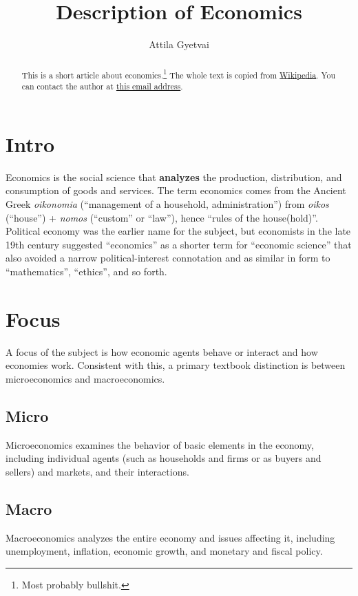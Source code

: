 \documentclass[11pt,a4paper]{article}	%
\title{Description of Economics}
\author{Attila Gyetvai}
\date{}									%
\begin{document}
\maketitle

\begin{abstract}
This is a short article about economics.\footnote{Most probably bullshit.}
The whole text is copied from \href{http://en.wikipedia.org/wiki/Economics}{Wikipedia}.
You can contact the author at \href{mailto:Gyetvai_Attila@student.ceu.hu}{this email address}.
\end{abstract}

\tableofcontents

\section{Intro}\label{sec:intro}

Economics is the social science that \textbf{analyzes} the production, distribution, and consumption of goods and services. \cite{wikiecon}
The term economics comes from the Ancient Greek \emph{oikonomia} (``management of a household, administration'') from \emph{oikos} (``house'') + \emph{nomos} (``custom'' or ``law''), hence ``rules of the house(hold)''.
Political economy was the earlier name for the subject, but economists in the late 19th century suggested ``economics'' as a shorter term for ``economic science'' that also avoided a narrow political-interest connotation and as similar in form to ``mathematics'', ``ethics'', and so forth.

\section{Focus}\label{sec:focus}

A focus of the subject is how economic agents behave or interact and how economies work.
Consistent with this, a primary textbook distinction is between microeconomics and macroeconomics.
\subsection*{Micro}
Microeconomics examines the behavior of basic elements in the economy, including individual agents (such as households and firms or as buyers and sellers) and markets, and their interactions.
\subsection*{Macro}
Macroeconomics analyzes the entire economy and issues affecting it, including unemployment, inflation, economic growth, and monetary and fiscal policy.
\end{document}
